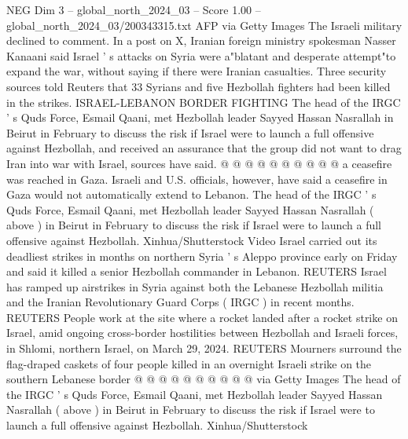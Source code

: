 \begin{textsample}{NEG Dim 3 – global\_north\_2024\_03 – Score 1.00 – global\_north\_2024\_03/200343315.txt}
AFP via Getty Images The Israeli military declined to comment.
In a post on X, Iranian foreign ministry spokesman Nasser Kanaani said Israel ' s attacks on Syria were a"blatant and desperate attempt"to expand the war, without saying if there were Iranian casualties.
Three security sources told Reuters that 33 Syrians and five Hezbollah fighters had been killed in the strikes.
ISRAEL-LEBANON BORDER FIGHTING The head of the IRGC ' s Quds Force, Esmail Qaani, met Hezbollah leader Sayyed Hassan Nasrallah in Beirut in February to discuss the risk if Israel were to launch a full offensive against Hezbollah, and received an assurance that the group did not want to drag Iran into war with Israel, sources have said. @ @ @ @ @ @ @ @ @ @ a ceasefire was reached in Gaza.
Israeli and U.S. officials, however, have said a ceasefire in Gaza would not automatically extend to Lebanon.
The head of the IRGC ' s Quds Force, Esmail Qaani, met Hezbollah leader Sayyed Hassan Nasrallah ( above ) in Beirut in February to discuss the risk if Israel were to launch a full offensive against Hezbollah.
Xinhua/Shutterstock Video Israel carried out its deadliest strikes in months on northern Syria ' s Aleppo province early on Friday and said it killed a senior Hezbollah commander in Lebanon.
REUTERS Israel has ramped up airstrikes in Syria against both the Lebanese Hezbollah militia and the Iranian Revolutionary Guard Corps ( IRGC ) in recent months.
REUTERS People work at the site where a rocket landed after a rocket strike on Israel, amid ongoing cross-border hostilities between Hezbollah and Israeli forces, in Shlomi, northern Israel, on March 29, 2024.
REUTERS Mourners surround the flag-draped caskets of four people killed in an overnight Israeli strike on the southern Lebanese border @ @ @ @ @ @ @ @ @ @ via Getty Images The head of the IRGC ' s Quds Force, Esmail Qaani, met Hezbollah leader Sayyed Hassan Nasrallah ( above ) in Beirut in February to discuss the risk if Israel were to launch a full offensive against Hezbollah.
Xinhua/Shutterstock

\end{textsample}
